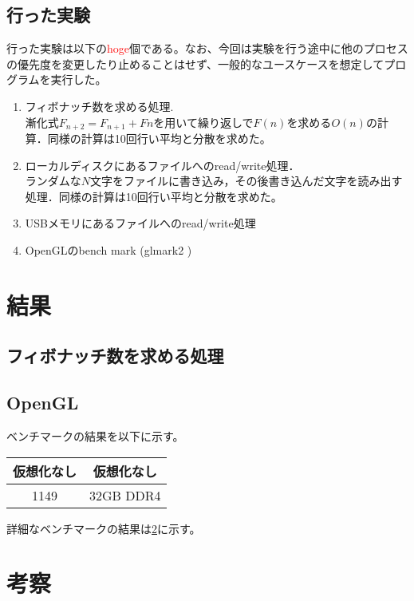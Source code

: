 \documentclass[onecolumn]{preport}
\begin{document}
\subsection{行った実験}
行った実験は以下の\textcolor{red}{hoge}個である。なお、今回は実験を行う途中に他のプロセスの優先度を変更したり止めることはせず、一般的なユースケースを想定してプログラムを実行した。
\begin {enumerate}
\item フィボナッチ数を求める処理.\\ 漸化式$F_{n+2} = F_{n+1} + F{n}$を用いて繰り返しで$F(n)$を求める$O(n)$の計算．同様の計算は10回行い平均と分散を求めた。
\item ローカルディスクにあるファイルへのread/write処理．\\ランダムな$N$文字をファイルに書き込み，その後書き込んだ文字を読み出す処理．同様の計算は10回行い平均と分散を求めた。
\item USBメモリにあるファイルへのread/write処理
\item OpenGLのbench mark (glmark2 \cite{glmark2})
\end {enumerate}

\section{結果}
\subsection{フィボナッチ数を求める処理}


\subsection{OpenGL}
ベンチマークの結果を以下に示す。
\begin{table}[htb]
  \begin{tabular}{c|c} \hline
    仮想化なし & 仮想化なし \\ \hline
    1149  & 32GB DDR4 \\ \hline
  \end{tabular}
\end{table}

詳細なベンチマークの結果は\ref{}に示す。

\section{考察}
\end{document}

